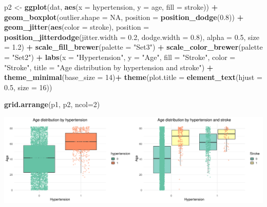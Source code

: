\documentclass[
]{article}
\newenvironment{Shaded}{\begin{snugshade}}{\end{snugshade}}
\newcommand{\AttributeTok}[1]{\textcolor[rgb]{0.13,0.29,0.53}{#1}}
\newcommand{\ConstantTok}[1]{\textcolor[rgb]{0.56,0.35,0.01}{#1}}
\newcommand{\DecValTok}[1]{\textcolor[rgb]{0.00,0.00,0.81}{#1}}
\newcommand{\FloatTok}[1]{\textcolor[rgb]{0.00,0.00,0.81}{#1}}
\newcommand{\FunctionTok}[1]{\textcolor[rgb]{0.13,0.29,0.53}{\textbf{#1}}}
\newcommand{\NormalTok}[1]{#1}
\newcommand{\OtherTok}[1]{\textcolor[rgb]{0.56,0.35,0.01}{#1}}
\newcommand{\SpecialCharTok}[1]{\textcolor[rgb]{0.81,0.36,0.00}{\textbf{#1}}}
\newcommand{\StringTok}[1]{\textcolor[rgb]{0.31,0.60,0.02}{#1}}
\begin{document}
\begin{Shaded}
\begin{Highlighting}[]
\NormalTok{p2 }\OtherTok{\textless{}{-}} \FunctionTok{ggplot}\NormalTok{(dat, }\FunctionTok{aes}\NormalTok{(}\AttributeTok{x =}\NormalTok{ hypertension, }\AttributeTok{y =}\NormalTok{ age, }\AttributeTok{fill =}\NormalTok{ stroke)) }\SpecialCharTok{+} 
      \FunctionTok{geom\_boxplot}\NormalTok{(}\AttributeTok{outlier.shape =} \ConstantTok{NA}\NormalTok{, }\AttributeTok{position =} \FunctionTok{position\_dodge}\NormalTok{(}\FloatTok{0.8}\NormalTok{)) }\SpecialCharTok{+}
      \FunctionTok{geom\_jitter}\NormalTok{(}\FunctionTok{aes}\NormalTok{(}\AttributeTok{color =}\NormalTok{ stroke), }
                  \AttributeTok{position =} \FunctionTok{position\_jitterdodge}\NormalTok{(}\AttributeTok{jitter.width =} \FloatTok{0.2}\NormalTok{, }\AttributeTok{dodge.width =} \FloatTok{0.8}\NormalTok{),}
                  \AttributeTok{alpha =} \FloatTok{0.5}\NormalTok{, }\AttributeTok{size =} \FloatTok{1.2}\NormalTok{) }\SpecialCharTok{+}
      \FunctionTok{scale\_fill\_brewer}\NormalTok{(}\AttributeTok{palette =} \StringTok{"Set3"}\NormalTok{) }\SpecialCharTok{+}
      \FunctionTok{scale\_color\_brewer}\NormalTok{(}\AttributeTok{palette =} \StringTok{"Set2"}\NormalTok{) }\SpecialCharTok{+}
      \FunctionTok{labs}\NormalTok{(}\AttributeTok{x =} \StringTok{"Hypertension"}\NormalTok{, }\AttributeTok{y =} \StringTok{"Age"}\NormalTok{, }\AttributeTok{fill =} \StringTok{"Stroke"}\NormalTok{, }\AttributeTok{color =} \StringTok{"Stroke"}\NormalTok{, }
           \AttributeTok{title =} \StringTok{"Age distribution by hypertension and stroke"}\NormalTok{) }\SpecialCharTok{+}
      \FunctionTok{theme\_minimal}\NormalTok{(}\AttributeTok{base\_size =} \DecValTok{14}\NormalTok{)}\SpecialCharTok{+}
      \FunctionTok{theme}\NormalTok{(}\AttributeTok{plot.title =} \FunctionTok{element\_text}\NormalTok{(}\AttributeTok{hjust =} \FloatTok{0.5}\NormalTok{, }\AttributeTok{size =} \DecValTok{16}\NormalTok{))}

\FunctionTok{grid.arrange}\NormalTok{(p1, p2, }\AttributeTok{ncol=}\DecValTok{2}\NormalTok{)}
\end{Highlighting}
\end{Shaded}

\includegraphics{Build-deploy-stroke-prediction-model-R_files/figure-latex/pairwise_age_hypertension-1.pdf}
\end{document}
